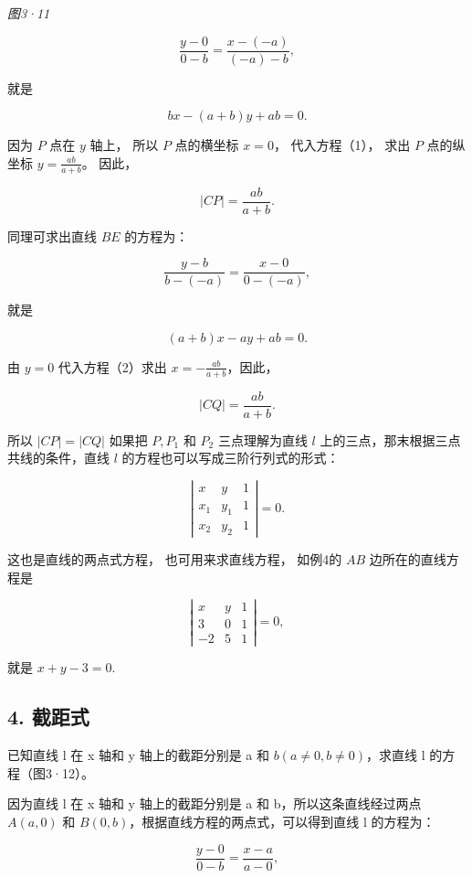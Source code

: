 \emph{图3·11}

\[
\frac {y - 0}{0 - b} = \frac {x - (- a)}{(- a) - b},
\]

就是

\[
b x - (a + b) y + a b = 0. \tag {1}
\]

因为 \(P\) 点在 \(y\) 轴上， 所以 \(P\) 点的横坐标 \(x = 0\)，
代入方程（1）， 求出 \(P\) 点的纵坐标 \(y = \frac{ab}{a + b}\)。 因此，

\[
| CP | = \frac {a b}{a + b}.
\]

同理可求出直线 \(BE\) 的方程为：

\[
\frac {y - b}{b - (- a)} = \frac {x - 0}{0 - (- a)},
\]

就是

\[
(a + b) x - a y + a b = 0. \tag {2}
\]

由 \(y = 0\) 代入方程（2）求出 \(x = -\frac{ab}{a + b}\)，因此，

\[
\left| CQ \right| = \frac {a b}{a + b}.
\]

所以 \(|CP| = |CQ|\) 如果把 \(P, P_{1}\) 和 \(P_{2}\) 三点理解为直线
\(l\) 上的三点，那末根据三点共线的条件，直线 \(l\)
的方程也可以写成三阶行列式的形式：

\[
\left| \begin{array}{ccc} x & y & 1 \\ x_{1} & y_{1} & 1 \\ x_{2} & y_{2} & 1 \end{array} \right| = 0.
\]

这也是直线的两点式方程， 也可用来求直线方程， 如例4的 \(AB\)
边所在的直线方程是

\[
\left| \begin{array}{ccc} x & y & 1 \\ 3 & 0 & 1 \\ - 2 & 5 & 1 \end{array} \right| = 0,
\]

就是 \(x + y - 3 = 0.\)

\subsection{4. 截距式}\label{ux622aux8dddux5f0f}

已知直线 l 在 x 轴和 y 轴上的截距分别是 a 和
\(b (a \neq 0, b \neq 0)\)，求直线 l 的方程（图3·12）。

因为直线 l 在 x 轴和 y 轴上的截距分别是 a 和 b，所以这条直线经过两点
\(A(a,0)\) 和 \(B(0,b)\)，根据直线方程的两点式，可以得到直线 l
的方程为：

\[
\frac {y - 0}{0 - b} = \frac {x - a}{a - 0},
\]


